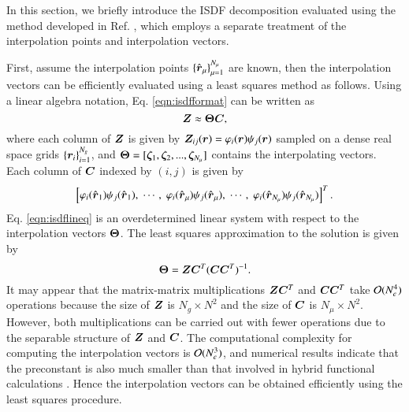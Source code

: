 In this section, we briefly introduce the ISDF decomposition 
\cite{JCP_302_329_2015_ISDF} evaluated using the method developed in Ref. 
\cite{JCTC_2017_ISDF}, which employs a separate treatment of the interpolation
points and interpolation vectors.

First, assume the interpolation points $
\{\smash{\hat{\bm{r}}}_\mu\}_{\mu=1}^{N_{\mu}}$ are known, then the interpolation vectors can
be efficiently evaluated using a least squares method as follows. Using a linear
algebra notation, Eq. \ref{eqn:isdfformat} can be written as
\begin{equation}\label{eqn:isdflineq}
  \bm{Z} \approx \bm{\Theta} \bm{C},
\end{equation}
where each column of $\bm{Z}$ is given by $\bm{Z}_{ij}(\bm{r})=\varphi_{i}(\bm{r})\psi_{j}
(\bm{r})$ sampled on a dense real space grids $\{\bm{r}_{i}\}_{i=1}^{N_g}$, and
$\bm{\Theta} = [\bm{\zeta}_1, \bm{\zeta}_2, ..., \bm{\zeta}_{N_{\mu}}]$ contains the
interpolating vectors. Each column of $\bm{C}$ indexed by $(i,j)$ is given by
\begin{equation}
\left[ \varphi_{i}(\smash{\hat{\bm{r}}}_1)\psi_{j}(\smash{\hat{\bm{r}}}_1),\; \cdots,\;
    \varphi_{i}(\smash{\hat{\bm{r}}}_\mu)\psi_{j}(\smash{\hat{\bm{r}}}_\mu),\; \cdots,\;
    \varphi_{i}(\smash{\hat{\bm{r}}}_{N_{\mu}})\psi_{j}(\smash{\hat{\bm{r}}}_{N_{\mu}})\right]^T.
\end{equation}
Eq. \ref{eqn:isdflineq} is an overdetermined linear system with respect to the
interpolation vectors $\bm{\Theta}$. The least squares approximation to the solution
is given by
\begin{equation}\label{eq:Theta}
  \bm{\Theta} = \bm{Z}\bm{C}^T (\bm{C}\bm{C}^T)^{-1}.
\end{equation}
It may appear that the matrix-matrix multiplications $\bm{Z}\bm{C}^T$ and $\bm{C}\bm{C}^T$
take $\mathcal{O}(N_{e}^{4})$ operations because the size of $\bm{Z}$ is $N_g \times N^2$
and the size of $\bm{C}$ is $N_{\mu} \times N^2$.  However, both multiplications
can be carried out with fewer operations due to the separable structure of $\bm{Z}$
and $\bm{C}$. The computational complexity for computing the interpolation vectors
is $\mathcal{O}(N_{e}^{3})$, and numerical results indicate that the preconstant is
also much smaller than that involved in hybrid functional calculations 
\cite{JCTC_2017_ISDF}. Hence the interpolation vectors can be obtained
efficiently using the least squares procedure.

